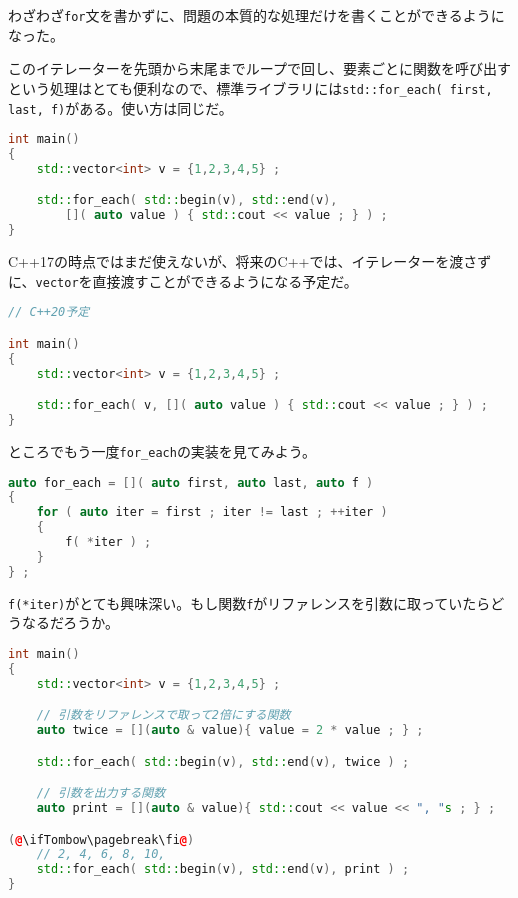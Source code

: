 わざわざ\texttt{for}文を書かずに、問題の本質的な処理だけを書くことができるようになった。

このイテレーターを先頭から末尾までループで回し、要素ごとに関数を呼び出すという処理はとても便利なので、標準ライブラリには\texttt{std::for\_each( first, last, f)}がある。使い方は同じだ。

\ifTombow\pagebreak\fi
\begin{lstlisting}[language={C++}]
int main()
{
    std::vector<int> v = {1,2,3,4,5} ;

    std::for_each( std::begin(v), std::end(v),
        []( auto value ) { std::cout << value ; } ) ;
}
\end{lstlisting}

C++17の時点ではまだ使えないが、将来のC++では、イテレーターを渡さずに、\texttt{vector}を直接渡すことができるようになる予定だ。

\begin{lstlisting}[language={C++}]
// C++20予定

int main()
{
    std::vector<int> v = {1,2,3,4,5} ;

    std::for_each( v, []( auto value ) { std::cout << value ; } ) ;
}
\end{lstlisting}

ところでもう一度\texttt{for\_each}の実装を見てみよう。

\begin{lstlisting}[language={C++}]
auto for_each = []( auto first, auto last, auto f )
{
    for ( auto iter = first ; iter != last ; ++iter )
    {
        f( *iter ) ;
    }
} ;
\end{lstlisting}

\texttt{f(*iter)}がとても興味深い。もし関数\texttt{f}がリファレンスを引数に取っていたらどうなるだろうか。

\begin{lstlisting}[language={C++}]
int main()
{
    std::vector<int> v = {1,2,3,4,5} ;

    // 引数をリファレンスで取って2倍にする関数
    auto twice = [](auto & value){ value = 2 * value ; } ;

    std::for_each( std::begin(v), std::end(v), twice ) ;

    // 引数を出力する関数
    auto print = [](auto & value){ std::cout << value << ", "s ; } ;

(@\ifTombow\pagebreak\fi@)
    // 2, 4, 6, 8, 10, 
    std::for_each( std::begin(v), std::end(v), print ) ;
}
\end{lstlisting}


